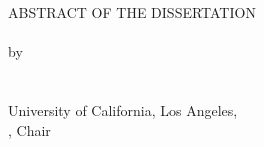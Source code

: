 \newpage
{}
{}
\begin{center}
ABSTRACT OF THE DISSERTATION\\[10pt]
\printtitle \\[5pt]
by \\[15pt]
\\[10pt]
\printdegree\\
University of California, Los Angeles, \\
, Chair
\end{center}   
   
